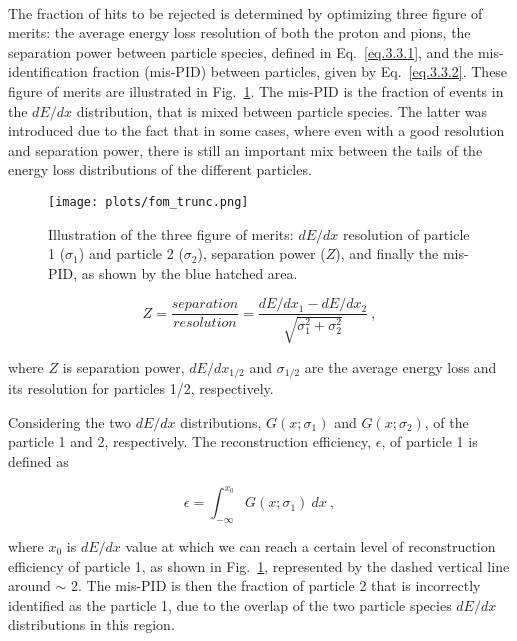 ~\par The fraction of hits to be rejected is determined by optimizing three figure of merits: the average energy loss resolution of both the proton and pions, the separation power between particle species, defined in Eq.~\ref{eq.3.3.1}, and the mis-identification fraction (mis-PID) between particles, given by Eq.~\ref{eq.3.3.2}. These figure of merits are illustrated in Fig.~\ref{fig.3.2.3}. The mis-PID is the fraction of events in the $dE/dx$ distribution, that is mixed between particle species. The latter was introduced due to the fact that in some cases, where even with a good resolution and separation power, there is still an important mix between the tails of the energy loss distributions of the different particles.

\begin{figure}[H]
    \centering
    \texttt{[image: plots/fom\_trunc.png]}
    \caption{\label{fig.3.2.3} Illustration of the three figure of merits: $dE/dx$ resolution of particle 1 ($\sigma_{1}$) and particle 2 ($\sigma_{2}$), separation power ($Z$), and finally the mis-PID, as shown by the blue hatched area.}
\end{figure}

\begin{equation}
    \label{eq.3.3.1}
    Z = \frac{separation}{resolution} = \frac{dE/dx_{1} - dE/dx_{2}}{\sqrt{\sigma_{1}^2 + \sigma_{2}^2}}~,
\end{equation}

\noindent where $Z$ is separation power, $dE/dx_{1/2}$ and $\sigma_{1/2}$ are the average energy loss and its resolution for particles 1/2, respectively.

Considering the two $dE/dx$ distributions, $G(x;\sigma_{1})$ and $G(x;\sigma_{2})$, of the particle 1 and 2, respectively. The reconstruction efficiency, $\epsilon$, of particle 1 is defined as

\begin{equation}
    \label{eq.3.3.2.1}
    \epsilon = \int_{-\infty}^{x_{0}} G(x;\sigma_{1})~dx~,
\end{equation}

\noindent where $x_{0}$ is $dE/dx$ value at which we can reach a certain level of reconstruction efficiency of particle 1, as shown in Fig.~\ref{fig.3.2.3}, represented by the dashed vertical line around $\sim$ 2. The mis-PID is then the fraction of particle 2 that is incorrectly identified as the particle 1, due to the overlap of the two particle species $dE/dx$ distributions in this region. 

